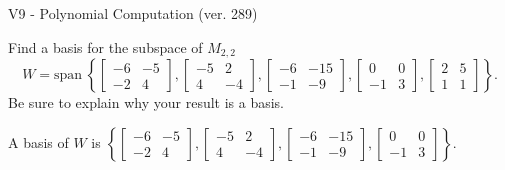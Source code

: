 \begin{exercise}
  \begin{exerciseTitle}V9 - Polynomial Computation (ver. 289)\end{exerciseTitle}
  \begin{exerciseStatement}
    Find a basis for the subspace of \(M_{2,2}\) 
\[W=\mathrm{span}\ \left\{\left[\begin{array}{cc}
-6 & -5 \\
-2 & 4
\end{array}\right] , \left[\begin{array}{cc}
-5 & 2 \\
4 & -4
\end{array}\right] , \left[\begin{array}{cc}
-6 & -15 \\
-1 & -9
\end{array}\right] , \left[\begin{array}{cc}
0 & 0 \\
-1 & 3
\end{array}\right] , \left[\begin{array}{cc}
2 & 5 \\
1 & 1
\end{array}\right]\right\}.\]
 Be sure to explain why your result is a basis.


  \end{exerciseStatement}
  \begin{exerciseAnswer}
   A basis of \(W\) is  \(\left\{\left[\begin{array}{cc}
-6 & -5 \\
-2 & 4
\end{array}\right] , \left[\begin{array}{cc}
-5 & 2 \\
4 & -4
\end{array}\right] , \left[\begin{array}{cc}
-6 & -15 \\
-1 & -9
\end{array}\right] , \left[\begin{array}{cc}
0 & 0 \\
-1 & 3
\end{array}\right]\right\}\).
  


  \end{exerciseAnswer}
\end{exercise}